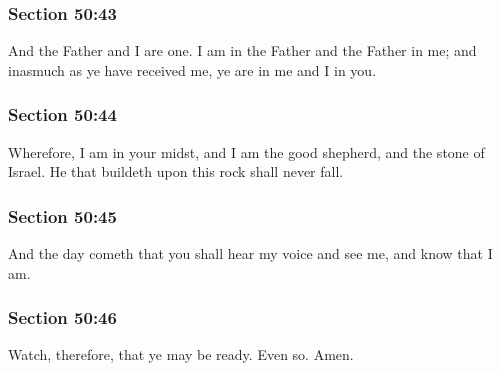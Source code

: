 	\subsubsection{Section 50:43} %
		\label{DC50-43}

		And the Father and I are one.  I am in the Father and the Father in me; and inasmuch as ye have received me, ye are in me and I in you.


	\subsubsection{Section 50:44} %
		\label{DC50-44}

		Wherefore, I am in your midst, and I am the good shepherd, and the stone of Israel.  He that buildeth upon this rock shall never fall.


	\subsubsection{Section 50:45} %
		\label{DC50-45}

		And the day cometh that you shall hear my voice and see me, and know that I am.


	\subsubsection{Section 50:46} %
		\label{DC50-46}

		Watch, therefore, that ye may be ready.  Even so.  Amen.

